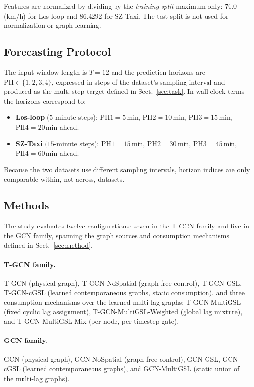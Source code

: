 Features are normalized by dividing by the \emph{training-split} maximum
only: $70.0$ (km/h) for Los-loop and $86.4292$ for SZ-Taxi. The test split is
not used for normalization or graph learning.

\subsection{Forecasting Protocol}\label{sec:protocol}

The input window length is $T=12$ and the prediction horizons are
$\mathrm{PH}\in\{1,2,3,4\}$, expressed in steps of the dataset's sampling
interval and produced as the multi-step target defined in
Sect.~\ref{sec:task}. In wall-clock terms the horizons correspond to:

\begin{itemize}
\item \textbf{Los-loop} ($5$-minute steps): $\mathrm{PH1}=5$\,min,
$\mathrm{PH2}=10$\,min, $\mathrm{PH3}=15$\,min, $\mathrm{PH4}=20$\,min ahead.
\item \textbf{SZ-Taxi} ($15$-minute steps): $\mathrm{PH1}=15$\,min,
$\mathrm{PH2}=30$\,min, $\mathrm{PH3}=45$\,min, $\mathrm{PH4}=60$\,min ahead.
\end{itemize}

Because the two datasets use different sampling intervals, horizon indices
are only comparable within, not across, datasets.

\subsection{Methods}\label{sec:methods}

The study evaluates twelve configurations: seven in the T-GCN family and five
in the GCN family, spanning the graph sources and consumption mechanisms
defined in Sect.~\ref{sec:method}.

\paragraph{T-GCN family.}
T-GCN (physical graph), T-GCN-NoSpatial (graph-free control), T-GCN-GSL,
T-GCN-cGSL (learned contemporaneous graphs, static consumption), and three
consumption mechanisms over the learned multi-lag graphs: T-GCN-MultiGSL
(fixed cyclic lag assignment), T-GCN-MultiGSL-Weighted (global lag mixture),
and T-GCN-MultiGSL-Mix (per-node, per-timestep gate).

\paragraph{GCN family.}
GCN (physical graph), GCN-NoSpatial (graph-free control), GCN-GSL,
GCN-cGSL (learned contemporaneous graphs), and GCN-MultiGSL (static union of
the multi-lag graphs).

